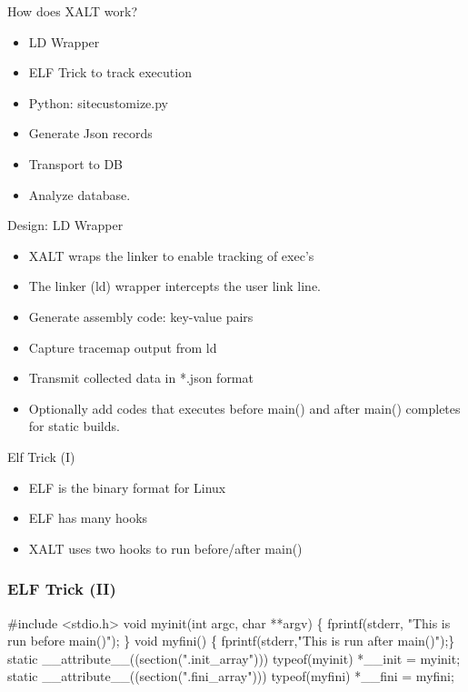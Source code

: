 \documentclass{beamer}
\begin{document}
\begin{frame}{How does XALT work?}
  \begin{itemize}
    \item LD Wrapper
    \item ELF Trick to track execution
    \item Python: sitecustomize.py
    \item Generate Json records
    \item Transport to DB
    \item Analyze database.
  \end{itemize}
\end{frame}

\begin{frame}{Design: LD Wrapper}
  \begin{itemize}
    \item XALT wraps the linker to enable tracking of exec's
    \item The linker (ld) wrapper intercepts the user link line.
    \item Generate assembly code: key-value pairs
    \item Capture tracemap output from ld
    \item Transmit collected data in *.json format
    \item Optionally add codes that executes before main() and after
      main() completes for static builds.
  \end{itemize}
\end{frame}


\begin{frame}{Elf Trick (I)}
  \begin{itemize}
    \item ELF is the binary format for Linux
    \item ELF has many hooks
    \item XALT uses two hooks to run before/after main()
  \end{itemize}
\end{frame}


\begin{frame}[fragile]
    \frametitle{ELF Trick (II)}
 {\small
    \begin{semiverbatim}
  #include <stdio.h>
  void myinit(int argc, char **argv)
  \{ fprintf(stderr, "This is run before main()\n"); \}
  void myfini()
  \{ fprintf(stderr,"This is run after main()\n");\}
  static __attribute__((section(".init_array")))
       typeof(myinit) *__init = myinit;
  static __attribute__((section(".fini_array")))
       typeof(myfini) *__fini = myfini;
    \end{semiverbatim}
}
\end{frame}
\end{document}
